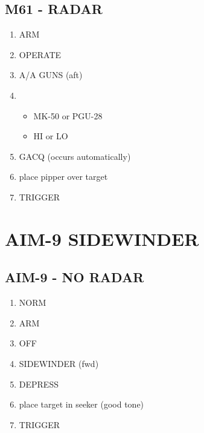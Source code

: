 \documentclass[fontInter, widesubsec]{TechCheck}
\begin{document}
	\subsection{M61 - RADAR}
	\begin{enumerate}
		\item {}\dotfill ARM
		\item {}\dotfill OPERATE
		\item {}\dotfill A/A GUNS (aft)
		\item {}
		\begin{itemize}
			\item {} MK-50 or PGU-28
			\item {} HI or LO
		\end{itemize}
	\item {}\dotfill GACQ (occurs automatically)
	\item {}\dotfill place pipper over target
	\item {}\dotfill TRIGGER
	\end{enumerate}

	\section{AIM-9 SIDEWINDER}

	\subsection{AIM-9 - NO RADAR}
	\begin{enumerate}
		\item {}\dotfill NORM
		\item {}\dotfill ARM
		\item {}\dotfill OFF
		\item {}\dotfill SIDEWINDER (fwd)
		\item {}\dotfill DEPRESS
		\item {}\dotfill place target in seeker (good tone)
		\item {}\dotfill TRIGGER
	\end{enumerate}
\end{document}
